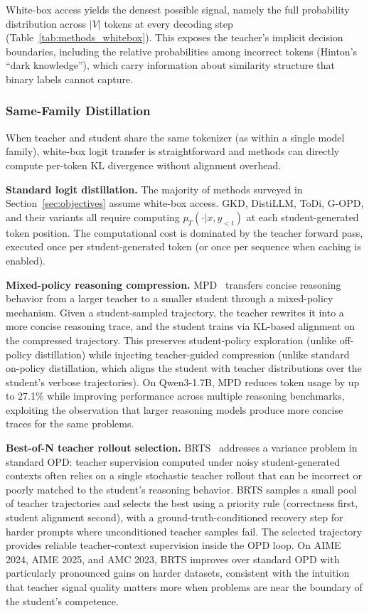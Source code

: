 \documentclass{article} %
\newcommand{\pteacher}{p_T}
\begin{document}
White-box access yields the densest possible signal, namely the full probability distribution across $|V|$ tokens at every decoding step (Table~\ref{tab:methods_whitebox}). This exposes the teacher's implicit decision boundaries, including the relative probabilities among incorrect tokens (Hinton's ``dark knowledge''), which carry information about similarity structure that binary labels cannot capture.

\subsubsection{Same-Family Distillation}
\label{subsubsec:same_family}

When teacher and student share the same tokenizer (as within a single model family), white-box logit transfer is straightforward and methods can directly compute per-token KL divergence without alignment overhead.

\textbf{Standard logit distillation.} The majority of methods surveyed in Section~\ref{sec:objectives} assume white-box access. GKD, DistiLLM, ToDi, G-OPD, and their variants all require computing $\pteacher(\cdot|x, y_{<t})$ at each student-generated token position. The computational cost is dominated by the teacher forward pass, executed once per student-generated token (or once per sequence when caching is enabled).

\textbf{Mixed-policy reasoning compression.} MPD~\citep{2605.08776} transfers concise reasoning behavior from a larger teacher to a smaller student through a mixed-policy mechanism. Given a student-sampled trajectory, the teacher rewrites it into a more concise reasoning trace, and the student trains via KL-based alignment on the compressed trajectory. This preserves student-policy exploration (unlike off-policy distillation) while injecting teacher-guided compression (unlike standard on-policy distillation, which aligns the student with teacher distributions over the student's verbose trajectories). On Qwen3-1.7B, MPD reduces token usage by up to 27.1\% while improving performance across multiple reasoning benchmarks, exploiting the observation that larger reasoning models produce more concise traces for the same problems.

\textbf{Best-of-N teacher rollout selection.} BRTS~\citep{2605.09725} addresses a variance problem in standard OPD: teacher supervision computed under noisy student-generated contexts often relies on a single stochastic teacher rollout that can be incorrect or poorly matched to the student's reasoning behavior. BRTS samples a small pool of teacher trajectories and selects the best using a priority rule (correctness first, student alignment second), with a ground-truth-conditioned recovery step for harder prompts where unconditioned teacher samples fail. The selected trajectory provides reliable teacher-context supervision inside the OPD loop. On AIME 2024, AIME 2025, and AMC 2023, BRTS improves over standard OPD with particularly pronounced gains on harder datasets, consistent with the intuition that teacher signal quality matters more when problems are near the boundary of the student's competence.
\end{document}
